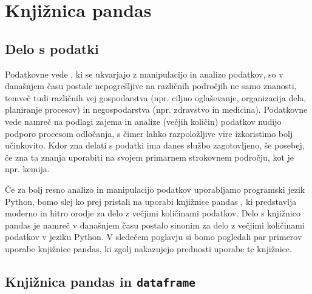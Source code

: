 \chapter{Knjižnica pandas}

\section{Delo s podatki}

Podatkovne vede , ki se ukvarjajo z manipulacijo in analizo podatkov, so v današnjem času postale nepogrešljive na različnih področjih ne samo znanosti, temveč tudi različnih vej gospodarstva (npr. ciljno oglaševanje, organizacija dela, planiranje procesov) in negospodarstva (npr. zdravstvo in medicina). Podatkovne vede namreč na podlagi zajema in analize (večjih količin) podatkov nudijo podporo procesom odločanja, s čimer lahko razpoložljive vire izkoristimo bolj učinkovito. Kdor zna delati s podatki ima danes službo zagotovljeno, še posebej, če zna ta znanja uporabiti na svojem primarnem strokovnem področju, kot je npr. kemija. 

Če za bolj resno analizo in manipulacijo podatkov uporabljamo programski jezik Python, bomo slej ko prej pristali na uporabi knjižnice pandas , ki predstavlja moderno in hitro orodje za delo z večjimi količinami podatkov. Delo s knjižnico pandas je namreč v današnjem času postalo sinonim za delo z večjimi količinami podatkov v jeziku Python. V sledečem poglavju si bomo pogledali par primerov uporabe knjižnice pandas, ki zgolj nakazujejo prednosti uporabe te knjižnice. 

\section{Knjižnica pandas in \texttt{dataframe}}

